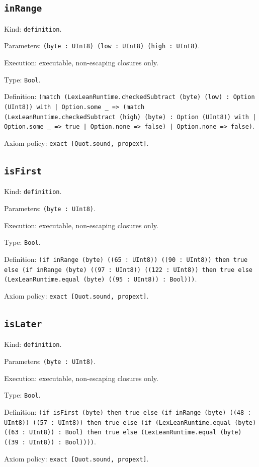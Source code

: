 \documentclass[11pt]{article}
\begin{document}
\subsection*{\texttt{inRange}}
\noindent Kind: \texttt{definition}.\par
\noindent Parameters: \texttt{(byte : UInt8) (low : UInt8) (high : UInt8)}.\par
\noindent Execution: executable, non-escaping closures only.\par
\noindent Type: \texttt{Bool}.\par
\noindent Definition: \texttt{(match (LexLeanRuntime.checkedSubtract (byte) (low) : Option (UInt8)) with | Option.some \_ => (match (LexLeanRuntime.checkedSubtract (high) (byte) : Option (UInt8)) with | Option.some \_ => true | Option.none => false) | Option.none => false)}.\par
\noindent Axiom policy: \texttt{exact [Quot.sound, propext]}.\par
\subsection*{\texttt{isFirst}}
\noindent Kind: \texttt{definition}.\par
\noindent Parameters: \texttt{(byte : UInt8)}.\par
\noindent Execution: executable, non-escaping closures only.\par
\noindent Type: \texttt{Bool}.\par
\noindent Definition: \texttt{(if inRange (byte) ((65 : UInt8)) ((90 : UInt8)) then true else (if inRange (byte) ((97 : UInt8)) ((122 : UInt8)) then true else (LexLeanRuntime.equal (byte) ((95 : UInt8)) : Bool)))}.\par
\noindent Axiom policy: \texttt{exact [Quot.sound, propext]}.\par
\subsection*{\texttt{isLater}}
\noindent Kind: \texttt{definition}.\par
\noindent Parameters: \texttt{(byte : UInt8)}.\par
\noindent Execution: executable, non-escaping closures only.\par
\noindent Type: \texttt{Bool}.\par
\noindent Definition: \texttt{(if isFirst (byte) then true else (if inRange (byte) ((48 : UInt8)) ((57 : UInt8)) then true else (if (LexLeanRuntime.equal (byte) ((63 : UInt8)) : Bool) then true else (LexLeanRuntime.equal (byte) ((39 : UInt8)) : Bool))))}.\par
\noindent Axiom policy: \texttt{exact [Quot.sound, propext]}.\par
\end{document}
